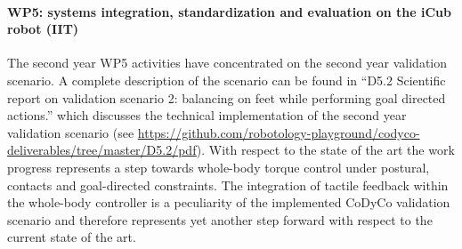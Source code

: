 
\paragraph*{WP5: systems integration, standardization and evaluation on the iCub robot (IIT)}

The second year WP5 activities have concentrated on the second year validation scenario. A complete description of the scenario can be found in ``D5.2 Scientific report on validation scenario 2: balancing on feet while performing goal directed actions.'' which discusses the technical implementation of the second year validation scenario (see \url{https://github.com/robotology-playground/codyco-deliverables/tree/master/D5.2/pdf}). With respect to the state of the art the work progress represents a step towards whole-body torque control under postural, contacts and goal-directed constraints. The integration of tactile feedback within the whole-body controller is a peculiarity of the implemented CoDyCo validation scenario and therefore represents yet another step forward with respect to the current state of the art. 